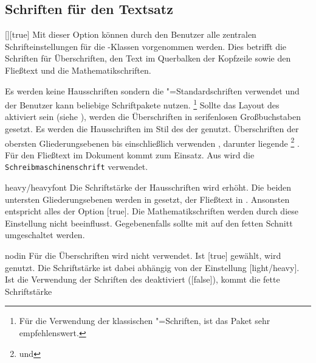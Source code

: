 \subsection{Schriften für den Textsatz}
\begin{Declaration}{[\PSet]}[true]%
\printdeclarationlist%
\label{sec:text}%
%
%
Mit dieser Option können durch den Benutzer alle zentralen Schrifteinstellungen 
für die \TUDScript-Klassen vorgenommen werden. Dies betrifft die Schriften für 
Überschriften, den Text im Querbalken der Kopfzeile sowie den Fließtext und die 
Mathematikschriften.
%
\begin{values}
\itemfalse
  Es werden keine Hausschriften sondern die "=Standardschriften 
  verwendet und der Benutzer kann beliebige Schriftpakete nutzen.%
  \footnote{%
    Für die Verwendung der klassischen "=Schriften, ist das Paket 
     sehr empfehlenswert.%
  }
  Sollte das Layout des \CDs aktiviert sein (siehe ), werden die 
  Überschriften in serifenlosen Großbuchstaben gesetzt.
  Es werden die Hausschriften im Stil des \CDs der \TnUD genutzt. Überschriften 
  der obersten Gliederungsebenen bis einschließlich  
  verwenden \DIN, darunter liegende%
  \footnote{ und } 
  . Für den Fließtext im Dokument kommt 
   zum Einsatz. Aus  wird die
  \texttt{Schreibmaschinenschrift} verwendet.
\item[heavy/heavyfont]
  Die Schriftstärke der Hausschriften wird erhöht. Die beiden untersten 
  Gliederungsebenen werden in  gesetzt, der Fließtext 
  in . Ansonsten entspricht alles der Option 
  [true]. Die Mathematikschriften werden durch diese 
  Einstellung nicht beeinflusst. Gegebenenfalls sollte mit  auf 
  den fetten Schnitt umgeschaltet werden.
\item[nodin]
  Für die Überschriften wird nicht \DIN verwendet. Ist [true] 
  gewählt, wird \Univers genutzt. Die Schriftstärke ist dabei abhängig von der 
  Einstellung [light/heavy]. Ist die Verwendung der Schriften 
  des \CDs deaktiviert ([false]), kommt die fette Schriftstärke 

\end{values}
\end{Declaration}
